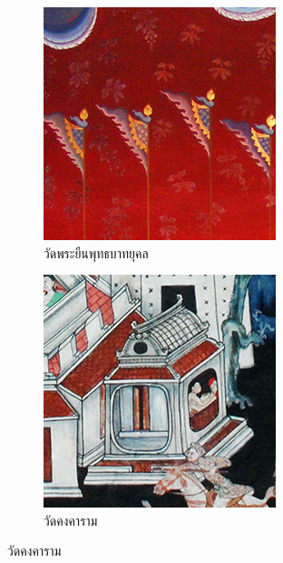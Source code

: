 \documentclass[hidelinks, a4paper,12pt]{article}
\numberwithin{equation}{section}							%
\numberwithin{equation}{section}
\begin{document}
{\begin{figure}[H]
			\bigskip
	
	
		\begin{subfigure}{0.4\linewidth}
			\centering
			\includegraphics[width=0.8\linewidth]{images/thaiart/case03-original.png}
			\caption{วัดพระยืนพุทธบาทยุคล}
			\label{image:thaiart_case03_original}			
		\end{subfigure}		
		\begin{subfigure}{0.4\linewidth}
			\centering
			\includegraphics[width=0.8\linewidth]{images/thaiart/case04-original.png}
			\caption{วัดคงคาราม}
			\label{image:thaiart_case04_original}			
		\end{subfigure}
	

\end{figure}}
\end{document}
